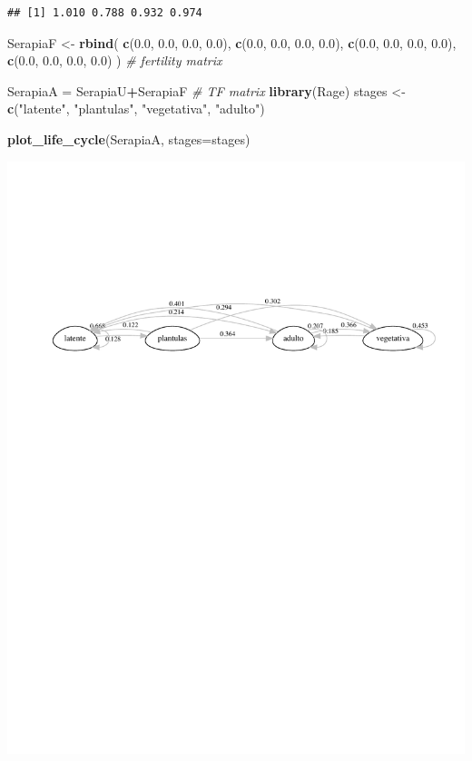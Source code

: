 \documentclass[
]{book}
\newenvironment{Shaded}{\begin{snugshade}}{\end{snugshade}}
\newcommand{\AttributeTok}[1]{\textcolor[rgb]{0.13,0.29,0.53}{#1}}
\newcommand{\CommentTok}[1]{\textcolor[rgb]{0.56,0.35,0.01}{\textit{#1}}}
\newcommand{\FloatTok}[1]{\textcolor[rgb]{0.00,0.00,0.81}{#1}}
\newcommand{\FunctionTok}[1]{\textcolor[rgb]{0.13,0.29,0.53}{\textbf{#1}}}
\newcommand{\NormalTok}[1]{#1}
\newcommand{\OtherTok}[1]{\textcolor[rgb]{0.56,0.35,0.01}{#1}}
\newcommand{\SpecialCharTok}[1]{\textcolor[rgb]{0.81,0.36,0.00}{\textbf{#1}}}
\newcommand{\StringTok}[1]{\textcolor[rgb]{0.31,0.60,0.02}{#1}}
\theoremstyle{definition}
\theoremstyle{definition}
\theoremstyle{definition}
\theoremstyle{definition}
\theoremstyle{remark}
\begin{document}
\begin{verbatim}
## [1] 1.010 0.788 0.932 0.974
\end{verbatim}

\begin{Shaded}
\begin{Highlighting}[]
\NormalTok{SerapiaF }\OtherTok{\textless{}{-}} \FunctionTok{rbind}\NormalTok{(}
  \FunctionTok{c}\NormalTok{(}\FloatTok{0.0}\NormalTok{, }\FloatTok{0.0}\NormalTok{, }\FloatTok{0.0}\NormalTok{, }\FloatTok{0.0}\NormalTok{),}
  \FunctionTok{c}\NormalTok{(}\FloatTok{0.0}\NormalTok{, }\FloatTok{0.0}\NormalTok{, }\FloatTok{0.0}\NormalTok{, }\FloatTok{0.0}\NormalTok{),}
  \FunctionTok{c}\NormalTok{(}\FloatTok{0.0}\NormalTok{, }\FloatTok{0.0}\NormalTok{, }\FloatTok{0.0}\NormalTok{, }\FloatTok{0.0}\NormalTok{),}
  \FunctionTok{c}\NormalTok{(}\FloatTok{0.0}\NormalTok{, }\FloatTok{0.0}\NormalTok{, }\FloatTok{0.0}\NormalTok{, }\FloatTok{0.0}\NormalTok{)}
\NormalTok{) }\CommentTok{\# fertility matrix}

\NormalTok{SerapiaA }\OtherTok{=}\NormalTok{ SerapiaU}\SpecialCharTok{+}\NormalTok{SerapiaF }\CommentTok{\# TF matrix}
\FunctionTok{library}\NormalTok{(Rage)}
\NormalTok{stages }\OtherTok{\textless{}{-}} \FunctionTok{c}\NormalTok{(}\StringTok{"latente"}\NormalTok{, }\StringTok{"plantulas"}\NormalTok{, }\StringTok{"vegetativa"}\NormalTok{, }\StringTok{"adulto"}\NormalTok{)}

\FunctionTok{plot\_life\_cycle}\NormalTok{(SerapiaA, }\AttributeTok{stages=}\NormalTok{stages)}
\end{Highlighting}
\end{Shaded}

\includegraphics{Diagnostico_Poblacional_files/figure-latex/unnamed-chunk-44-1.pdf}
\end{document}
